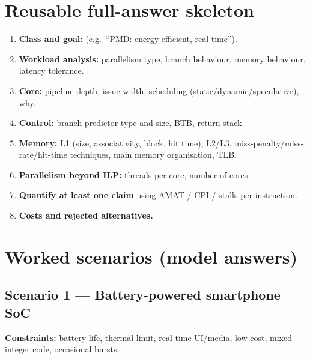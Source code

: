 \normalsize

\section{Reusable full-answer skeleton}
\begin{enumerate}[leftmargin=*]
\item \textbf{Class and goal:} (e.g.\ ``PMD: energy-efficient, real-time'').
\item \textbf{Workload analysis:} parallelism type, branch behaviour, memory behaviour, latency tolerance.
\item \textbf{Core:} pipeline depth, issue width, scheduling (static/dynamic/speculative), why.
\item \textbf{Control:} branch predictor type and size, BTB, return stack.
\item \textbf{Memory:} L1 (size, associativity, block, hit time), L2/L3, miss-penalty/miss-rate/hit-time techniques, main memory organisation, TLB.
\item \textbf{Parallelism beyond ILP:} threads per core, number of cores.
\item \textbf{Quantify at least one claim} using AMAT / CPI / stalls-per-instruction.
\item \textbf{Costs and rejected alternatives.}
\end{enumerate}

\section{Worked scenarios (model answers)}

\subsection*{Scenario 1 --- Battery-powered smartphone SoC}
\textbf{Constraints:} battery life, thermal limit, real-time UI/media, low cost, mixed integer code, occasional bursts.

